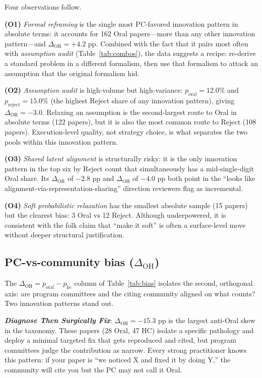 \documentclass[10pt,a4paper]{article}
\begin{document}
Four observations follow.

\textbf{(O1)} \emph{Formal reframing} is the single most PC-favored innovation pattern in absolute terms: it accounts for 162 Oral papers---more than any other innovation pattern---and $\Delta_{\text{OR}}{=}{+}4.2$ pp. Combined with the fact that it pairs most often with \emph{assumption audit} (Table~\ref{tab:combos}), the data suggests a recipe: re-derive a standard problem in a different formalism, then use that formalism to attack an assumption that the original formalism hid.

\textbf{(O2)} \emph{Assumption audit} is high-volume but high-variance: $p_\text{oral}{=}12.0\%$ and $p_\text{reject}{=}15.0\%$ (the highest Reject share of any innovation pattern), giving $\Delta_{\text{OR}}{=}{-}3.0$. Relaxing an assumption is the second-largest route to Oral in absolute terms (122 papers), but it is also the most common route to Reject (108 papers). Execution-level quality, not strategy choice, is what separates the two pools within this innovation pattern.

\textbf{(O3)} \emph{Shared latent alignment} is structurally risky: it is the only innovation pattern in the top six by Reject count that simultaneously has a mid-single-digit Oral share. Its $\Delta_{\text{OR}}$ of $-2.8$ pp and $\Delta_{\text{OH}}$ of $-4.0$ pp both point in the ``looks like alignment-via-representation-sharing'' direction reviewers flag as incremental.

\textbf{(O4)} \emph{Soft probabilistic relaxation} has the smallest absolute sample (15 papers) but the clearest bias: 3 Oral vs 12 Reject. Although underpowered, it is consistent with the folk claim that ``make it soft'' is often a surface-level move without deeper structural justification.

\subsection{PC-vs-community bias ($\Delta_{\text{OH}}$)}

The \(\Delta_{\text{OH}}{=}p_\text{oral}-p_\text{hc}\) column of Table~\ref{tab:bias} isolates the second, orthogonal axis: are program committees and the citing community aligned on what counts? Two innovation patterns stand out.

\textbf{\emph{Diagnose Then Surgically Fix}}: $\Delta_{\text{OH}}{=}{-}15.3$ pp is the largest anti-Oral skew in the taxonomy. These papers (28 Oral, 47 HC) isolate a specific pathology and deploy a minimal targeted fix that gets reproduced and cited, but program committees judge the contribution as narrow. Every strong practitioner knows this pattern: if your paper is ``we noticed X and fixed it by doing Y,'' the community will cite you but the PC may not call it Oral.
\end{document}
